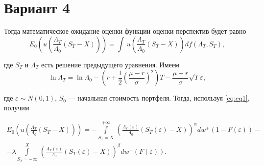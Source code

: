 \documentclass{article}
\begin{document}
\section*{Вариант 4}
Тогда математическое ожидание оценки функции оценки перспектив будет равно
\begin{equation*}
  E_0\left(u\left(\frac{\Lambda_T}{\Lambda_0}\left(S_T - X\right)\right)\right)=\int\,u\left(\frac{\Lambda_T}{\Lambda_0}\left(S_T - X\right)\right)df\left(\Lambda_T, S_T\right) ,
\end{equation*}

где $S_T$ и $\Lambda_T$ есть решение предыдущего уравнения. Имеем
\begin{equation}
  \label{eq:eq1}
  \ln\Lambda_T = \ln\Lambda_0 - \left(r + \frac{1}{2}\left(\frac{\mu - r}{\sigma}\right)^2\right)T - \frac{\mu - r}{\sigma}\sqrt{T}\varepsilon ,
\end{equation}

где $\varepsilon\sim N(0,1)$, $S_0$ --- начальная стоимость портфеля. Тогда, используя \eqref{eq:eq1}, получим

\begin{multline}
  E_0\left(u\left(\frac{\Lambda_T}{\Lambda_0}\left(S_T - X\right)\right)\right)=
  -\int\limits_{S_T = X}^{+\infty}\,\left(\frac{\Lambda_T\left(\varepsilon\right)}{\Lambda_0}\left(S_T\left(\varepsilon\right) - X\right)\right)^{\alpha}dw^+\left(1-F\left(\varepsilon\right)\right) - \\ 
-\lambda\int\limits_{S_T = -\infty}^{X}\,\left(\frac{\Lambda_T\left(\varepsilon\right)}{\Lambda_0}\left(S_T\left(\varepsilon\right) - X\right)\right)^{\beta}dw^-\left(F\left(\varepsilon\right)\right).
\end{multline}
\end{document}
